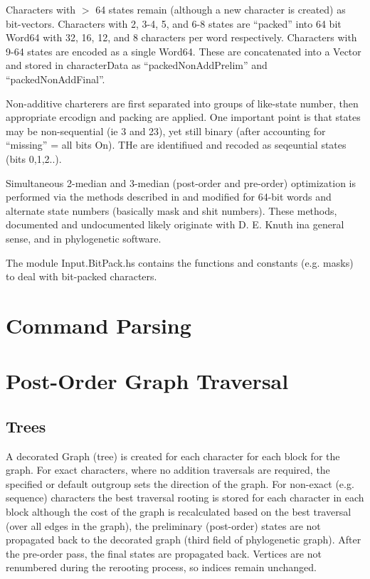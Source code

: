 \documentclass[11pt]{article}
\begin{document}
		Characters with $>$ 64 states remain (although a new character is created) as bit-vectors.  Characters with 
		2, 3-4, 5, and 6-8 states are ``packed'' into 64 bit Word64 with 32, 16, 12, and 8 characters per word respectively. Characters with 9-64 states are encoded as a single Word64. These are concatenated into a Vector and stored in characterData as ``packedNonAddPrelim'' and ``packedNonAddFinal''.
		
		Non-additive charterers are first separated into groups of like-state number, then appropriate ercodign
		and packing are applied.  One important point is that states may be non-sequential (ie 3 and 23), yet
		still binary (after accounting for ``missing'' = all bits On).  THe are identifiued and recoded as seqeuntial states (bits 0,1,2..).
		
		Simultaneous 2-median and 3-median (post-order and pre-order) optimization is performed via the methods described in \cite{WhiteandHolland2011} and \cite{goloboff2002} modified for 64-bit words and alternate state numbers (basically mask and shit numbers).  These methods, documented and undocumented likely originate with D. E. Knuth ina general sense, and \cite{Farris1988} in phylogenetic software.
		
		The module Input.BitPack.hs contains the functions and constants (e.g. masks) to deal 
		with bit-packed characters.
		
	\section {Command Parsing}
	
	\section{Post-Order Graph Traversal}
		\subsection{Trees}
		A decorated Graph (tree) is created for each character for each block for the graph.  For exact characters, where no addition traversals are required, 
		the specified or default
		outgroup sets the direction of the graph.  For non-exact (e.g. sequence) characters the best traversal rooting is stored for each character in each block
		although the cost of the graph is recalculated based on the best traversal (over all edges in the graph), the preliminary (post-order) states are not propagated back
		to the decorated graph (third field of phylogenetic graph).  After the pre-order pass, the final states are propagated back.
		Vertices are not renumbered during the rerooting process, so indices remain unchanged.
		
\end{document}
